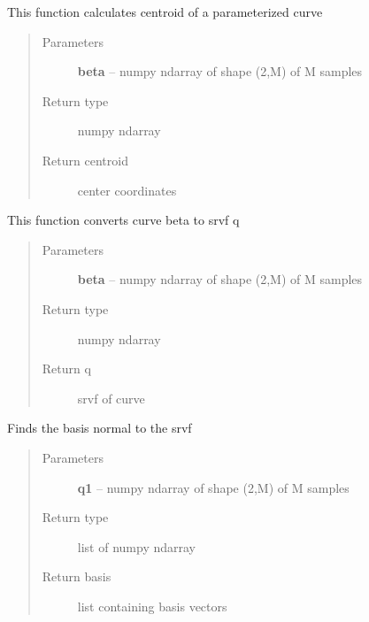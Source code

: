 \documentclass[letterpaper,10pt,english]{sphinxmanual}
\begin{document}
\begin{fulllineitems}
\label{curve_functions:curve_functions.calculatecentroid}
This function calculates centroid of a parameterized curve
\begin{quote}\begin{description}
\item[{Parameters}] \leavevmode
\textbf{beta} -- numpy ndarray of shape (2,M) of M samples

\item[{Return type}] \leavevmode
numpy ndarray

\item[{Return centroid}] \leavevmode
center coordinates

\end{description}\end{quote}

\end{fulllineitems}


\begin{fulllineitems}
\label{curve_functions:curve_functions.curve_to_q}
This function converts curve beta to srvf q
\begin{quote}\begin{description}
\item[{Parameters}] \leavevmode
\textbf{beta} -- numpy ndarray of shape (2,M) of M samples

\item[{Return type}] \leavevmode
numpy ndarray

\item[{Return q}] \leavevmode
srvf of curve

\end{description}\end{quote}

\end{fulllineitems}


\begin{fulllineitems}
\label{curve_functions:curve_functions.find_basis_normal}
Finds the basis normal to the srvf
\begin{quote}\begin{description}
\item[{Parameters}] \leavevmode
\textbf{q1} -- numpy ndarray of shape (2,M) of M samples

\item[{Return type}] \leavevmode
list of numpy ndarray

\item[{Return basis}] \leavevmode
list containing basis vectors

\end{description}\end{quote}

\end{fulllineitems}
\end{document}
